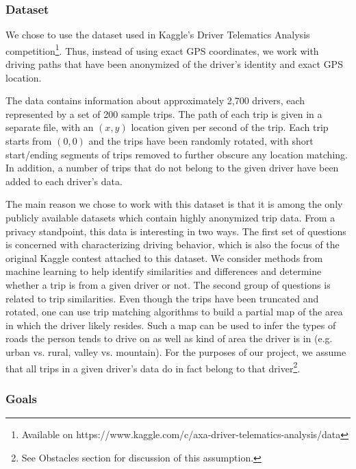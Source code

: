 \documentclass{article}
\begin{document}
\subsubsection{Dataset}

We chose to use the dataset used in Kaggle's Driver Telematics Analysis competition\footnote{Available on https://www.kaggle.com/c/axa-driver-telematics-analysis/data}. Thus, instead of using exact GPS coordinates, we work with driving paths that have been anonymized of the driver's identity and exact GPS location. 

The data contains information about approximately 2,700 drivers, each represented by a set of 200 sample trips. The path of each trip is given in a separate file, with an $(x,y)$ location given per second of the trip. Each trip starts from $(0,0)$ and the trips have been randomly rotated, with short start/ending segments of trips removed to further obscure any location matching. In addition, a number of trips that do not belong to the given driver have been added to each driver's data.

The main reason we chose to work with this dataset is that it is among the only publicly available datasets which contain highly anonymized trip data. From a privacy standpoint, this data is interesting in two ways. The first set of questions is concerned with characterizing driving behavior, which is also the focus of the original Kaggle contest attached to this dataset. We consider methods from machine learning to help identify similarities and differences and determine whether a trip is from a given driver or not. The second group of questions is related to trip similarities. Even though the trips have been truncated and rotated, one can use trip matching algorithms to build a partial map of the area in which the driver likely resides. Such a map can be used to infer the types of roads the person tends to drive on as well as kind of area the driver is in (e.g. urban vs. rural, valley vs. mountain). For the purposes of our project, we assume that all trips in a given driver's data do in fact belong to that driver\footnote{See Obstacles section for discussion of this assumption.}. 

\subsubsection{Goals}


\end{document}
